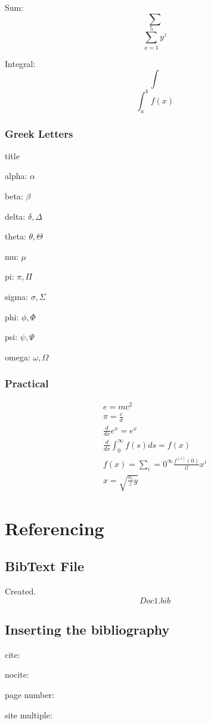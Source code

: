 \documentclass[a4paper,12pt]{article}
\begin{document}
Sum:
$$\sum$$
$$\sum_{x=1}^5 y^z$$

Integral:
$$\int$$
$$\int_a^b f(x)$$


\subsubsection{Greek Letters}
title

alpha:
$\alpha$

beta:
$\beta$

delta:
$\delta, \Delta$

theta:
$\theta, \Theta$

mu:
$\mu$

pi:
$\pi, \Pi$

sigma:
$\sigma, \Sigma$

phi:
$\phi, \Phi$

psi:
$\psi, \Psi$

omega:
$\omega, \Omega$


\subsubsection{Practical}
\begin{eqnarray}
e = mc^2 \\
\pi = \frac{c}{d} \\
\frac{d}{dx}e^x = e^x \\
\frac{d}{dx}\int_0^\infty f(s)ds = f(x) \\
f(x) = \sum_i = 0^\infty\frac{f^(i)(0)}{i!}x^i \\
x = \sqrt{\frac{x_i}{z}y}
\end{eqnarray}


\section{Referencing}
\subsection{BibText File}
Created.
$$Doc1.bib$$

\subsection{Inserting the bibliography}
cite:
\cite{Connollyetal2014}

nocite:
\nocite{Connollyetal2016}

page number:
\cite[p.214]{Connollyetal2016}

site multiple:
\cite{Connollyetal2016, Connollyetal2015, Connollyetal2014, Connollyetal2013}
\end{document}
